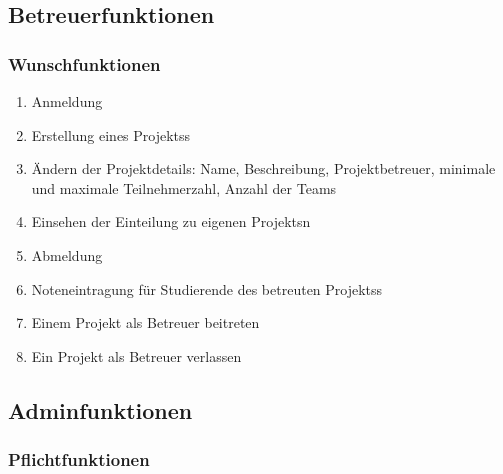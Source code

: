 \documentclass[parskip=full]{scrartcl}
\newcommand{\swtLabel}[1]{\textbf{/#1\arabic*0/}}
\begin{document}
\subsection{Betreuerfunktionen}
\subsubsection{Wunschfunktionen}

\begin{enumerate}[label=\swtLabel{FA}, resume]
  \item Anmeldung  \label{FAbetreueranmeldung}
  \item Erstellung eines \glspl{Projekt}s \label{FAbetreuer+projekt}
  \item Ändern der Projektdetails: Name, Beschreibung, Projektbetreuer,
        minimale und maximale Teilnehmerzahl, Anzahl der Teams
        \label{FAbetreuerProjektänderung}%
  \item Einsehen der Einteilung zu eigenen \glspl{Projekt}n
  \label{FAbetreuereinsicht}
  \item Abmeldung \label{FAbetreuerabmeldung}
  \item Noteneintragung für Studierende des betreuten \glspl{Projekt}s
  \label{FAbetreuernoten}
  \item Einem \gls{Projekt} als Betreuer beitreten \label{FAjoinBetreuer}
  \item Ein \gls{Projekt} als Betreuer verlassen \label{FAleaveBetreuer}
\end{enumerate}

\subsection{Adminfunktionen}

\subsubsection{Pflichtfunktionen}
\end{document}
